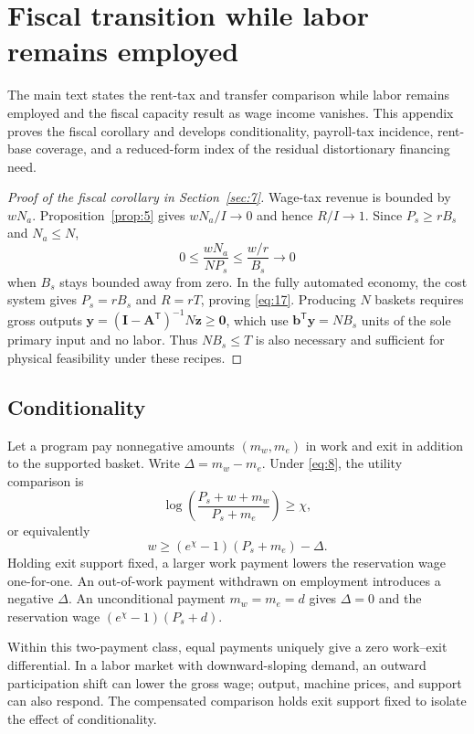 \documentclass[12pt]{article}
\theoremstyle{plain}
\begin{document}
\section{Fiscal transition while labor remains employed}\label{app:D}

The main text states the rent-tax and transfer comparison while labor remains employed and the fiscal capacity result as wage income vanishes. This appendix proves the fiscal corollary and develops conditionality, payroll-tax incidence, rent-base coverage, and a reduced-form index of the residual distortionary financing need.

\begin{proof}[Proof of the fiscal corollary in Section~\ref{sec:7}]
Wage-tax revenue is bounded by $wN_a$. Proposition~\ref{prop:5} gives $wN_a/I\to0$ and hence $R/I\to1$. Since $P_s\ge rB_s$ and $N_a\le N$,
\[
0\le\frac{wN_a}{NP_s}\le\frac{w/r}{B_s}\to0
\]
when $B_s$ stays bounded away from zero. In the fully automated economy, the cost system gives $P_s=rB_s$ and $R=rT$, proving \eqref{eq:17}. Producing $N$ baskets requires gross outputs $\mathbf{y}=(\mathbf{I}-\mathbf{A}^{\mathsf{T}})^{-1}N\mathbf{z}\ge\mathbf{0}$, which use $\mathbf{b}^{\mathsf{T}}\mathbf{y}=NB_s$ units of the sole primary input and no labor. Thus $NB_s\le T$ is also necessary and sufficient for physical feasibility under these recipes.
\end{proof}

\subsection{Conditionality}\label{app:D.1}

Let a program pay nonnegative amounts $(m_w,m_e)$ in work and exit in addition to the supported basket. Write $\Delta=m_w-m_e$. Under \eqref{eq:8}, the utility comparison is
\[
\log\left(\frac{P_s+w+m_w}{P_s+m_e}\right)\ge\chi,
\]
or equivalently
\begin{equation}\label{eq:27}
w\ge(e^\chi-1)(P_s+m_e)-\Delta.
\end{equation}
Holding exit support fixed, a larger work payment lowers the reservation wage one-for-one. An out-of-work payment withdrawn on employment introduces a negative $\Delta$. An unconditional payment $m_w=m_e=d$ gives $\Delta=0$ and the reservation wage $(e^\chi-1)(P_s+d)$.

Within this two-payment class, equal payments uniquely give a zero work--exit differential. In a labor market with downward-sloping demand, an outward participation shift can lower the gross wage; output, machine prices, and support can also respond. The compensated comparison holds exit support fixed to isolate the effect of conditionality.
\end{document}
